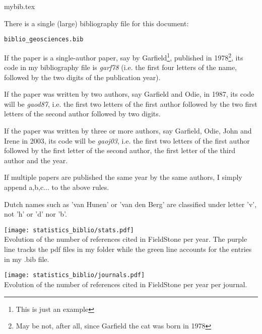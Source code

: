 \begin{flushright} {\tiny {\color{gray} mybib.tex}} \end{flushright}

There is a single (large) bibliography file for this document:
\begin{center}
{\tt biblio\_geosciences.bib}
\end{center}

If the paper is a single-author paper, say by Garfield\footnote{This is just an example}, 
published in 1978\footnote{May be not, after all, since Garfield the cat was born in 1978}, its code 
in my bibliography file is {\sl garf78} (i.e. the first four letters of the name, followed by 
the two digits of the publication year).

If the paper was written by two authors, say Garfield and Odie, in 1987, its code 
will be {\sl gaod87}, i.e. the first two letters of the first author followed by the two 
first letters of the second author followed by two digits.

If the paper was written by three or more authors, say Garfield, Odie, John and Irene in 
2003, its code will be {\sl gaoj03}, i.e. the first two letters of the first author followed 
by the first letter of the second author, the first letter of the third author and the year.

If multiple papers are published the same year by the same authors, I simply append a,b,c... to the 
above rules. 

\begin{remark} Dutch names such as 'van Hunen' or 'van den Berg' are classified under letter 'v', 
not 'h' or 'd' nor 'b'. 
\end{remark}

\vspace{1cm}

\begin{center}
\texttt{[image: statistics\_biblio/stats.pdf]}\\
{\captionfont Evolution of the number of references cited in FieldStone
per year. The purple line tracks the pdf files in my folder while 
the green line accounts for the entries in my .bib file.}
\end{center}

\begin{center}
\texttt{[image: statistics\_biblio/journals.pdf]}\\
{\captionfont Evolution of the number of references cited in FieldStone
per year per journal.}
\end{center}





